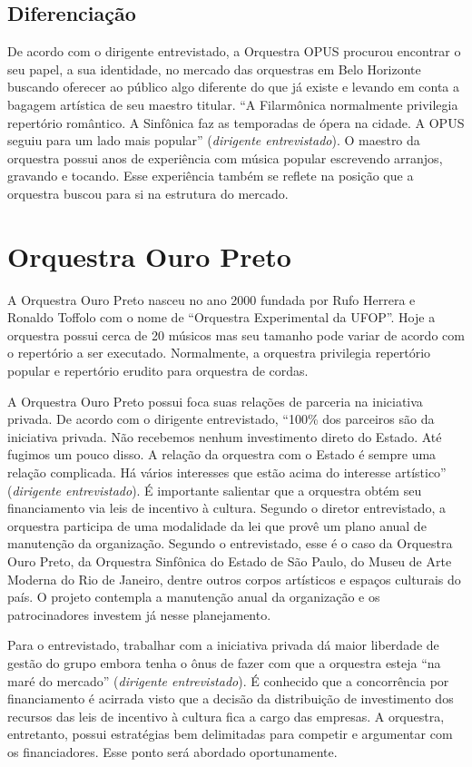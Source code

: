 \documentclass[a4paper, 12pt, openright, oneside, german, french, english, brazil]{abntex2}
\begin{document}
	\section{Diferenciação}
	
	De acordo com o dirigente entrevistado, a Orquestra OPUS procurou encontrar o seu papel, a sua identidade, no mercado das orquestras em Belo Horizonte buscando oferecer ao público algo diferente do que já existe e levando em conta a bagagem artística de seu maestro titular. ``A Filarmônica normalmente privilegia repertório romântico. A Sinfônica faz as temporadas de ópera na cidade. A OPUS seguiu para um lado mais popular'' (\textit{dirigente entrevistado}). O maestro da orquestra possui anos de experiência com música popular escrevendo arranjos, gravando e tocando. Esse experiência também se reflete na posição que a orquestra buscou para si na estrutura do mercado.
	
	
	\chapter{Orquestra Ouro Preto}
	
	A Orquestra Ouro Preto nasceu no ano 2000 fundada por Rufo Herrera e Ronaldo Toffolo com o nome de ``Orquestra Experimental da UFOP''. Hoje a orquestra possui cerca de 20 músicos mas seu tamanho pode variar de acordo com o repertório a ser executado. Normalmente, a orquestra privilegia repertório popular e repertório erudito para orquestra de cordas.
	
	A Orquestra Ouro Preto possui foca suas relações de parceria na iniciativa privada. De acordo com o dirigente entrevistado, ``100\% dos parceiros são da iniciativa privada. Não recebemos nenhum investimento direto do Estado. Até fugimos um pouco disso. A relação da orquestra com o Estado é sempre uma relação complicada. Há vários interesses que estão acima do interesse artístico'' (\textit{dirigente entrevistado}). É importante salientar que a orquestra obtém seu financiamento via leis de incentivo à cultura. Segundo o diretor entrevistado, a orquestra participa de uma modalidade da lei que provê um plano anual de manutenção da organização. Segundo o entrevistado, esse é o caso da Orquestra Ouro Preto, da Orquestra Sinfônica do Estado de São Paulo, do Museu de Arte Moderna do Rio de Janeiro, dentre outros corpos artísticos e espaços culturais do país. O projeto contempla a manutenção anual da organização e os patrocinadores investem já nesse planejamento.
	
	Para o entrevistado, trabalhar com a iniciativa privada dá maior liberdade de gestão do grupo embora tenha o ônus de fazer com que a orquestra esteja ``na maré do mercado'' (\textit{dirigente entrevistado}). É conhecido que a concorrência por financiamento é acirrada visto que a decisão da distribuição de investimento dos recursos das leis de incentivo à cultura fica a cargo das empresas. A orquestra, entretanto, possui estratégias bem delimitadas para competir e argumentar com os financiadores. Esse ponto será abordado oportunamente.
	
\end{document}
